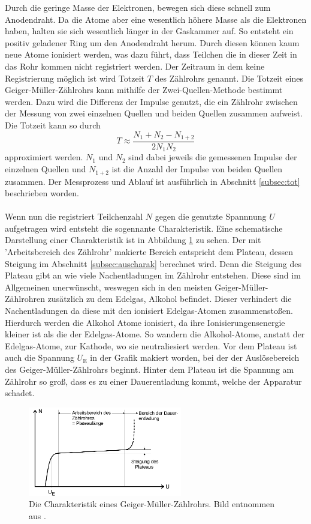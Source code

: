 Durch die geringe Masse der Elektronen, bewegen sich diese schnell zum Anodendraht.
Da die Atome aber eine wesentlich höhere Masse als die Elektronen haben, halten sie sich wesentlich länger in der Gaskammer auf.
So entsteht ein positiv geladener Ring um den Anodendraht herum.
Durch diesen können kaum neue Atome ionisiert werden, was dazu führt, dass Teilchen die in dieser Zeit in das Rohr kommen nicht registriert werden.
Der Zeitraum in dem keine Registrierung möglich ist wird Totzeit $T$ des Zählrohrs genannt.
Die Totzeit eines Geiger-Müller-Zählrohrs kann mithilfe der Zwei-Quellen-Methode bestimmt werden.
Dazu wird die Differenz der Impulse genutzt, die ein Zählrohr zwischen der Messung von zwei einzelnen Quellen und beiden Quellen zusammen aufweist.
Die Totzeit kann so durch
\begin{equation}
    T \approx \frac{N_1+N_2-N_{1+2}}{2N_1 N_2}
    \label{eq:totzeit}
\end{equation} 
approximiert werden.
$N_1$ und $N_2$ sind dabei jeweils die gemessenen Impulse der einzelnen Quellen und $N_{1+2}$ ist die Anzahl der Impulse von beiden Quellen zusammen.
Der Messprozess und Ablauf ist ausführlich in Abschnitt \ref{subsec:tot} beschrieben worden.
\\\\
Wenn nun die registriert Teilchenzahl $N$ gegen die genutzte Spannnung $U$ aufgetragen wird entsteht die sogennante Charakteristik.
Eine schematische Darstellung einer Charakteristik ist in Abbildung \ref{fig:schemcharak} zu sehen.
Der mit 'Arbeitsbereich des Zählrohr' makierte Bereich entspricht dem Plateau, dessen Steigung im Abschnitt \ref{subsec:auscharak} berechnet wird.
Denn die Steigung des Plateau gibt an wie viele Nachentladungen im Zählrohr entstehen.
Diese sind im Allgemeinen unerwünscht, weswegen sich in den meisten Geiger-Müller-Zählrohren zusätzlich zu dem Edelgas, Alkohol befindet.
Dieser verhindert die Nachentladungen da diese mit den ionisiert Edelgas-Atomen zusammenstoßen.
Hierdurch werden die Alkohol Atome ionisiert, da ihre Ionisierungensenergie kleiner ist als die der Edelgas-Atome.
So wandern die Alkohol-Atome, anstatt der Edelgas-Atome, zur Kathode, wo sie neutraliesiert werden.
Vor dem Plateau ist auch die Spannung $U_\text{E}$ in der Grafik makiert worden, bei der der Auslösebereich des Geiger-Müller-Zählrohrs beginnt.
Hinter dem Plateau ist die Spannung am Zählrohr so groß, dass es zu einer Dauerentladung kommt, welche der Apparatur schadet.

\begin{figure}
    \centering
    \includegraphics[width=0.6\textwidth]{content/data/charak.png}
    \caption{Die Charakteristik eines Geiger-Müller-Zählrohrs. Bild entnommen aus \cite{anleitung}.}
    \label{fig:schemcharak}
\end{figure}

